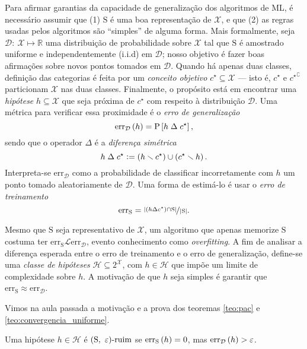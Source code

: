 Para afirmar garantias da capacidade de generalização dos algoritmos de ML, é necessário assumir que (1) $\mathrm{S}$ é uma boa representação de $\mathcal{X}$, e que (2) as regras usadas pelos algoritmos são ``simples'' de alguma forma. Mais formalmente, seja $\mathcal{D}\colon\ \mathcal{X}\mapsto\mathds{R}$ uma distribuição de probabilidade sobre $\mathcal{X}$ tal que $\mathrm{S}$ é amostrado uniforme e independentemente (i.i.d) em $\mathcal{D}$; nosso objetivo é fazer boas afirmações sobre novos pontos tomados em $\mathcal{D}$. Quando há apenas duas classes, definição das categorias é feita por um \textit{conceito objetivo} $c^\star\subseteq\mathcal{X}$ --- isto é, $c^\star$ e ${c^\star}^\complement$ particionam $\mathcal{X}$ nas duas classes. Finalmente, o propósito está em encontrar uma \textit{hipótese} $h\subseteq\mathcal{X}$ que seja próxima de $c^\star$ com respeito à distribuição $\mathcal{D}$. Uma métrica para verificar essa proximidade é o \textit{erro de generalização}
\[
  \mathrm{err}_\mathcal{D}\left(h\vphantom{1j}\right)=\mathrm{P}\left[h\mathrel{\Delta}c^\star\vphantom{1j}\right],
\]
sendo que o operador $\Delta$ é a \textit{diferença simétrica}
\[
  h\mathrel{\Delta}c^\star\vcentcolon=\left(h\setminus c^\star\vphantom{1j}\right)\cup\left(c^\star\setminus h\vphantom{1j}\right).
\]
Interpreta-se $\mathrm{err}_\mathcal{D}$ como a probabilidade de classificar incorretamente com $h$ um ponto tomado aleatoriamente de $\mathcal{D}$. Uma forma de estimá-lo é usar o \textit{erro de treinamento}
\[
  \mathrm{err}_\mathrm{S}=\nicefrac{\left|\left(h\mathrel{\Delta}c^\star\vphantom{1j}\right)\cap\mathrm{S}\vphantom{1j}\right|}{\left|\mathrm{S}\vphantom{1j}\right|}.
\]

Mesmo que $\mathrm{S}$ seja representativo de $\mathcal{X}$, um algoritmo que apenas memorize $\mathrm{S}$ costuma ter $\mathrm{err}_\mathrm{S}\mathcal{L}\mathrm{err}_\mathcal{D}$, evento conhecimento como \textit{overfitting}. A fim de analisar a diferença esperada entre o erro de treinamento e o erro de generalização, define-se uma \textit{classe de hipóteses} $\mathcal{H}\subseteq 2^\mathcal{X}$, com $h\in\mathcal{H}$ que impõe um limite de complexidade sobre $h$. A motivação de que $h$ seja simples é garantir que $\mathrm{err}_\mathrm{S}\approx\mathrm{err}_\mathcal{D}$.

Vimos na aula passada a motivação e a prova dos teoremas \autoref{teo:pac} e \autoref{teo:convergencia_uniforme}.

\begin{definicao}
  Uma hipótese $h\in\mathcal{H}$ é $\left(\mathrm{S},\ \eps\vphantom{1j}\right)\!\text{-ruim}$ se $\mathrm{err}_\mathrm{S}\left(h\vphantom{1j}\right)=0$, mas $\mathrm{err}_\mathcal{D}\left(h\vphantom{1j}\right)>\eps$.
\end{definicao}

